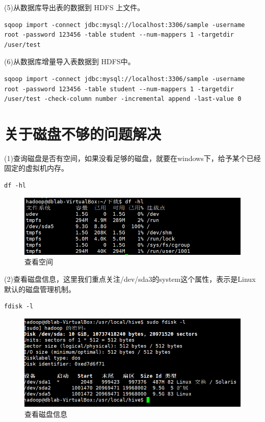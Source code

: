 \documentclass[12pt]{article}
\begin{document}
(5)从数据库导出表的数据到 HDFS 上文件。
\begin{lstlisting}
sqoop import -connect jdbc:mysql://localhost:3306/sample -username root -password 123456 -table student --num-mappers 1 -targetdir /user/test
\end{lstlisting}

(6)从数据库增量导入表数据到 HDFS中。
\begin{lstlisting}
sqoop import -connect jdbc:mysql://localhost:3306/sample -username root -password 123456 -table student --num-mappers 1 -targetdir /user/test -check-column number -incremental append -last-value 0
\end{lstlisting}

\section{关于磁盘不够的问题解决}

(1)查询磁盘是否有空间，如果没看足够的磁盘，就要在windows下，给予某个已经固定的虚拟机内存。

\begin{lstlisting}
df -hl
\end{lstlisting}

\begin{figure}[ht]
\centering
\includegraphics[scale=1.2]{figures/27.png}
\caption{查看空间}\label{fig:label2}
\end{figure}

(2)查看磁盘信息，这里我们重点关注/dev/sda3的system这个属性，表示是Linux默认的磁盘管理机制。

\begin{lstlisting}
fdisk -l
\end{lstlisting}

\begin{figure}[ht]
\centering
\includegraphics[scale=0.9]{figures/28.png}
\caption{查看磁盘信息}\label{fig:label2}
\end{figure}
\end{document}
